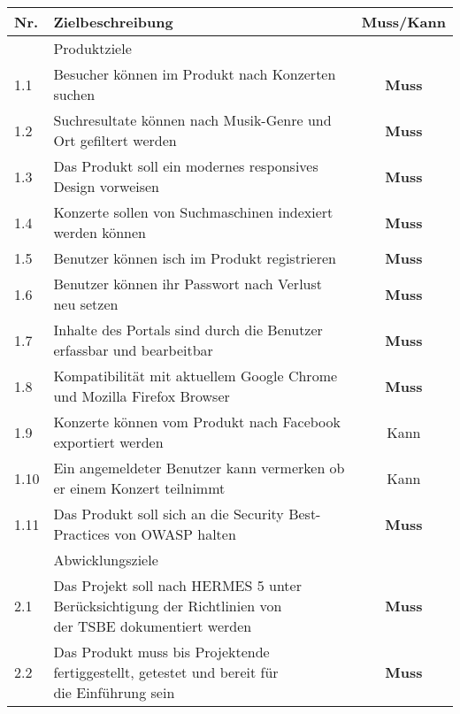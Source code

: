 \begin{longtable}[]{@{}llc@{}}
  \toprule
  Nr.  & Zielbeschreibung                                                                                                                 & Muss/Kann\tabularnewline
  \toprule
       & Produktziele\tabularnewline
  \midrule
  1.1  & Besucher können im Produkt nach Konzerten suchen                                                                                 & \textbf{Muss}\tabularnewline
  1.2  & Suchresultate können nach Musik-Genre und Ort gefiltert werden                                                                   & \textbf{Muss}\tabularnewline
  1.3  & Das Produkt soll ein modernes responsives Design vorweisen                                                                       & \textbf{Muss}\tabularnewline
  1.4  & Konzerte sollen von Suchmaschinen indexiert werden können                                                                        & \textbf{Muss}\tabularnewline
  1.5  & Benutzer können isch im Produkt registrieren                                                                                     & \textbf{Muss}\tabularnewline
  1.6  & Benutzer können ihr Passwort nach Verlust neu setzen                                                                             & \textbf{Muss}\tabularnewline
  1.7  & Inhalte des Portals sind durch die Benutzer erfassbar und bearbeitbar                                                            & \textbf{Muss}\tabularnewline
  1.8  & Kompatibilität mit aktuellem Google Chrome und Mozilla Firefox Browser                                                           & \textbf{Muss}\tabularnewline
  1.9  & Konzerte können vom Produkt nach Facebook exportiert werden                                                                      & Kann\tabularnewline
  1.10 & Ein angemeldeter Benutzer kann vermerken ob er einem Konzert teilnimmt                                                           & Kann\tabularnewline
  1.11 & Das Produkt soll sich an die Security Best-Practices von OWASP halten                                                            & \textbf{Muss}\tabularnewline
  \bottomrule
       & Abwicklungsziele\tabularnewline
  \midrule
  2.1  & \makecell[l]{Das Projekt soll nach HERMES 5 unter Berücksichtigung der Richtlinien von                                                                          \\ der TSBE dokumentiert werden} & \textbf{Muss}\tabularnewline
  2.2  & \makecell[l]{Das Produkt muss bis Projektende fertiggestellt, getestet und                                            bereit für                                \\ die Einführung sein}     & \textbf{Muss}\tabularnewline

\end{longtable}
